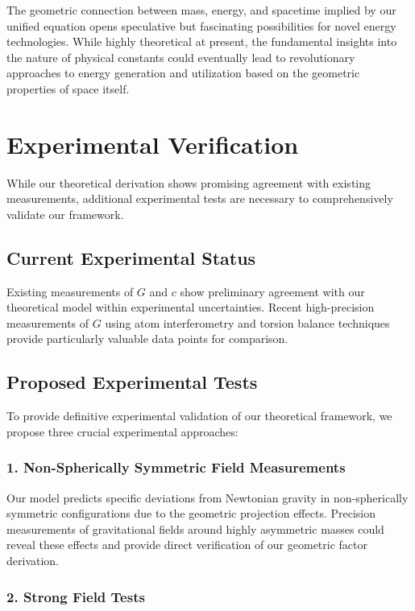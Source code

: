 \documentclass[12pt]{article}
\numberwithin{equation}{section}
\begin{document}
The geometric connection between mass, energy, and spacetime implied by our unified equation opens speculative but fascinating possibilities for novel energy technologies. While highly theoretical at present, the fundamental insights into the nature of physical constants could eventually lead to revolutionary approaches to energy generation and utilization based on the geometric properties of space itself.

\section{Experimental Verification}
\label{sec:experimental_verification}

While our theoretical derivation shows promising agreement with existing measurements, additional experimental tests are necessary to comprehensively validate our framework.

\subsection{Current Experimental Status}

Existing measurements of $G$ and $c$ show preliminary agreement with our theoretical model within experimental uncertainties. Recent high-precision measurements of $G$ using atom interferometry \citep{fixler2007} and torsion balance techniques \citep{wagner2020} provide particularly valuable data points for comparison.

\subsection{Proposed Experimental Tests}

To provide definitive experimental validation of our theoretical framework, we propose three crucial experimental approaches:

\subsubsection{1. Non-Spherically Symmetric Field Measurements}

Our model predicts specific deviations from Newtonian gravity in non-spherically symmetric configurations due to the geometric projection effects. Precision measurements of gravitational fields around highly asymmetric masses could reveal these effects and provide direct verification of our geometric factor derivation.

\subsubsection{2. Strong Field Tests}
\end{document}
